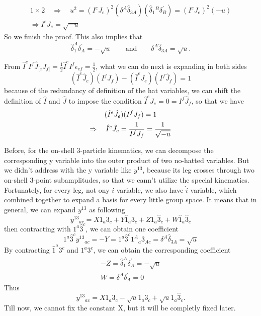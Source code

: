 \documentclass[12pt]{article}
\begin{document}
\begin{gather}
    1\times2 \quad \Rightarrow \quad u^2=(I^eJ_e)^2(\delta^A\hat{\delta}_{3A})(\hat{\delta}_1{}^B\delta^\prime_B)=(I^eJ_e)^2(-u)\\
    \Longrightarrow I^eJ_e=\sqrt{-u}
\end{gather}
So we finish the proof. This also implies that 
\begin{equation}
    \hat{\delta}_1^A\delta^\prime_A=-\sqrt{u}\qquad \text{and}\qquad \delta^A\hat{\delta}_{3A}=\sqrt{u}.
\end{equation}

From $\hat{I}^eI^f\hat{J}_{[e}J_{f]}=\frac{1}{2}\hat{I}^eI^f\epsilon_{ef}=\frac{1}{2}$, what we can do next is expanding in both sides
\begin{equation}
    (\hat{I}^e\hat{J}_e)(I^fJ_f)-(\hat{I}^eJ_e)(I^f\hat{J}_f)=1
\end{equation}
because of the redundancy of definition of the hat variables, we can shift the definition of $\hat{I}$ and $\hat{J}$ to impose the condition 
$\hat{I}^eJ_e=0=I^f\hat{J}_f$, so that we have
\begin{gather}
    (\hat{I}^e\hat{J}_e)(I^fJ_f)=1\notag \\
    \Rightarrow \quad \hat{I}^e\hat{J}_e=\frac{1}{I^fJ_f}=\frac{1}{\sqrt{-u}}
\end{gather}

Before, for the on-shell 3-particle kinematics, we can decompose the corresponding y variable into the outer product of two no-hatted variables. 
But we didn't address with the y variable like $y^{13}$, because its leg crosses through two on-shell 3-point subamplitudes, so that we cann't utilize 
the special kinematics. Fortunately, for every leg, not ony $i$ variable, we also have $\hat{i}$ variable, which combined together to expand a basis for every little group space.
It means that in general, we can expand $y^{13}$ as following
\begin{equation}
    y^{13}{}_{ac}=X1_a3_c+Y\hat{1}_a3_c+Z1_a\hat{3}_c+W\hat{1}_a\hat{3}_c
\end{equation}
then contracting with $1^a\hat{3}^c$, we can obtain one coefficient
\begin{equation}
    1^a\hat{3}^cy^{13}{}_{ac}=-Y=1^a\hat{3}^c1^A{}_a3_{Ac}=\delta^A\hat{\delta}_{3A}=\sqrt{u}
\end{equation}
By contracting $\hat{1}^a3^c$ and $1^a3^c$, we can obtain the corresponding coefficient
\begin{gather}
    -Z=\hat{\delta}_1^A\delta^\prime_A=-\sqrt{u}\\
    W=\delta^A\delta^\prime_A=0
\end{gather}
Thus 
\begin{equation}
    y^{13}{}_{ac}=X1_a3_c-\sqrt{u}\hat{1}_a3_c+\sqrt{u}1_a\hat{3}_c.
\end{equation}
Till now, we cannot fix the constant X, but it will be completly fixed later.
\end{document}
